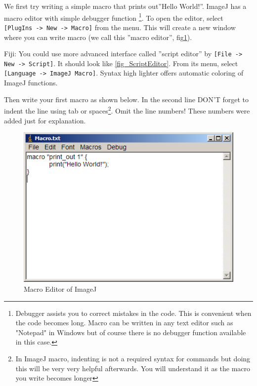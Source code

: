 \documentclass[11pt,a4paper,oneside]{report}
\newenvironment{indentFiji}%
{\begin{list}{}%
         {\setlength{\leftmargin}{1em}}%
         \item[]%
}
{\end{list}}
\newcommand{\ijmenu}[1]{\texttt{\small#1}}
\begin{document}
We first try writing a simple macro that prints out''Hello World!''. 
ImageJ has a macro editor with simple debugger function
\footnote{Debugger assists you to correct mistakes in the code. 
This is convenient when the code becomes long. 
Macro can be written in any text editor such as "Notepad" in Windows but of course 
there is no debugger function available in this case.}. 
To open the editor, select \ijmenu{[PlugIns -> New -> Macro]} from the menu.  
This will create a new window where you can write macro (we call this ''macro
editor'', fig\ref{fig_MacroEditor}).
\begin{indentFiji}
Fiji: You could use more advanced interface called ''script editor'' 
by \ijmenu{[File -> New -> Script]}. It should look like \ref{fig_ScriptEditor}. 
From its menu, select \ijmenu{[Language -> ImageJ Macro]}. 
Syntax high lighter offers automatic coloring of ImageJ functions. 
\end{indentFiji}
Then write your first macro as shown below. In the second line DON'T forget to
indent the line using tab or spaces\footnote{In ImageJ macro, indenting is not a required
syntax for commands but doing this will be very very helpful afterwards. You
will understand it as the macro you write becomes longer}. Omit the line
numbers! These numbers were added just for explanation.


%


\begin{figure}[htbp]
\begin{center}
\includegraphics[scale=0.6]{fig/editor_helloworld_IJ.png}
\caption{Macro Editor of ImageJ} \label{fig_MacroEditor}
\end{center}
\end{figure}
\end{document}
